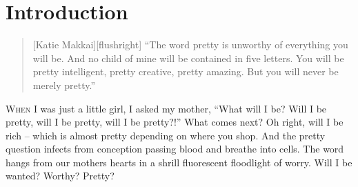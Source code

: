 \documentclass[thesis.tex]{subfiles}
\begin{document}
\chapter{Introduction}
\begin{quote}[Katie Makkai][flushright]
``The word pretty is unworthy of everything you will be. And no child of mine will be contained in five letters. You will be pretty intelligent, pretty creative, pretty amazing. But you will never be merely pretty.''
\end{quote}

\lettrine[nindent=0em]{W}{hen} I was just a little girl, I asked my mother, ``What will I be? Will I be pretty, will I be pretty, will I be pretty?!'' What comes next? Oh right, will I be rich -- which is almost pretty depending on where you shop. And the pretty question infects from conception passing blood and breathe into cells. The word hangs from our mothers hearts in a shrill fluorescent floodlight of worry. Will I be wanted? Worthy? Pretty?
\end{document}
